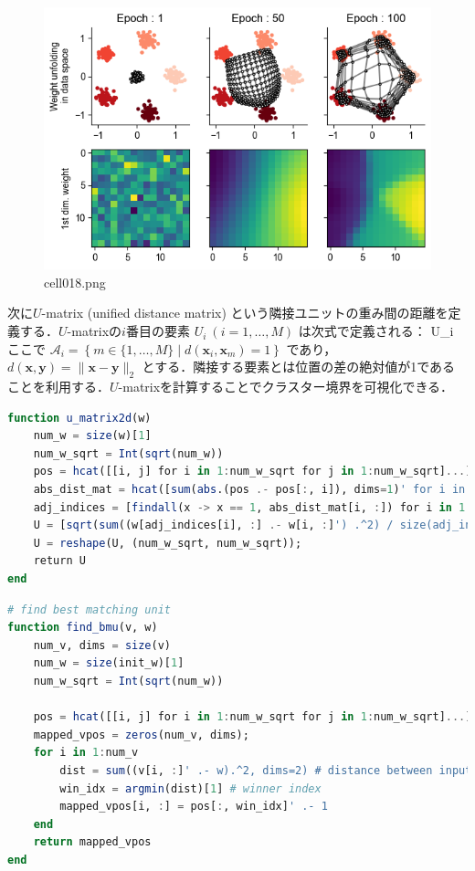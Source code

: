 \begin{figure}[ht]
	\centering
	\includegraphics[scale=0.8, max width=\linewidth]{./fig/local-learning-rule/self-organizing-map/cell018.png}
	\caption{cell018.png}
	\label{cell018.png}
\end{figure}
次に$U$-matrix (unified distance matrix) という隣接ユニットの重み間の距離を定義する．$U$-matrixの$i$番目の要素 $U_i\ (i=1, \ldots, M)$ は次式で定義される：
U_{i}\coloneqq {}
ここで $\mathcal{A}_i=\left\{m \in \{1, \ldots, M\} \mid d(\textbf{x}_i, \textbf{x}_m) = 1\right\}$ であり， $d(\mathbf{x}, \mathbf{y})=\|\mathbf{x} - \mathbf{y}\|_2$ とする．隣接する要素とは位置の差の絶対値が1であることを利用する．$U$-matrixを計算することでクラスター境界を可視化できる．
\begin{lstlisting}[language=julia]
function u_matrix2d(w)
    num_w = size(w)[1]
    num_w_sqrt = Int(sqrt(num_w))
    pos = hcat([[i, j] for i in 1:num_w_sqrt for j in 1:num_w_sqrt]...)
    abs_dist_mat = hcat([sum(abs.(pos .- pos[:, i]), dims=1)' for i in 1:num_w]...)
    adj_indices = [findall(x -> x == 1, abs_dist_mat[i, :]) for i in 1:num_w] # adjacent indices
    U = [sqrt(sum((w[adj_indices[i], :] .- w[i, :]') .^2) / size(adj_indices[i])[1]) for i in 1:num_w]
    U = reshape(U, (num_w_sqrt, num_w_sqrt));
    return U
end
\end{lstlisting}
\begin{lstlisting}[language=julia]
# find best matching unit
function find_bmu(v, w)
    num_v, dims = size(v)
    num_w = size(init_w)[1]
    num_w_sqrt = Int(sqrt(num_w))

    pos = hcat([[i, j] for i in 1:num_w_sqrt for j in 1:num_w_sqrt]...)
    mapped_vpos = zeros(num_v, dims);
    for i in 1:num_v
        dist = sum((v[i, :]' .- w).^2, dims=2) # distance between input and neurons
        win_idx = argmin(dist)[1] # winner index
        mapped_vpos[i, :] = pos[:, win_idx]' .- 1
    end
    return mapped_vpos
end
\end{lstlisting}
